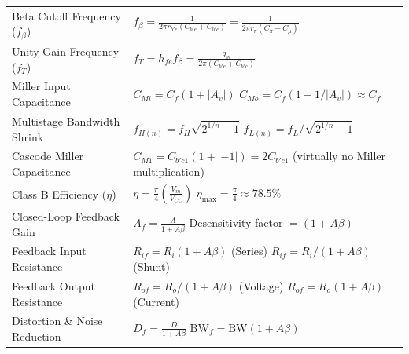 \documentclass[12pt,a4paper]{article}
\renewcommand{\arraystretch}{1.45}
\begin{document}
\begin{tcolorbox}[formulabox, title={Key Formulas at a Glance}]
\small
\renewcommand{\arraystretch}{1.35}
\setlength{\tabcolsep}{5pt}
\noindent\begin{tabularx}{\linewidth}{B{4.1cm}Y}
Beta Cutoff Frequency ($f_\beta$) & $f_\beta = \frac{1}{2\pi r_{b'e}(C_{b'e}+C_{b'c})} = \frac{1}{2\pi r_\pi (C_\pi + C_\mu)}$ \\[3pt]
Unity-Gain Frequency ($f_T$) & $f_T = h_{fe} f_\beta = \frac{g_m}{2\pi (C_{b'e}+C_{b'c})}$ \\[3pt]
Miller Input Capacitance & $C_{Mi} = C_f(1 + |A_v|)$ \newline $C_{Mo} = C_f(1 + 1/|A_v|) \approx C_f$ \\[3pt]
Multistage Bandwidth Shrink & $f_{H(n)} = f_H \sqrt{2^{1/n}-1}$ \newline $f_{L(n)} = f_L / \sqrt{2^{1/n}-1}$ \\[3pt]
Cascode Miller Capacitance & $C_{M1} = C_{b'c1}(1 + |-1|) = 2C_{b'c1}$ (virtually no Miller multiplication) \\[3pt]
Class B Efficiency ($\eta$) & $\eta = \frac{\pi}{4}\left(\frac{V_m}{V_{CC}}\right)$ \newline $\eta_{\max} = \frac{\pi}{4} \approx 78.5\%$ \\[3pt]
Closed-Loop Feedback Gain & $A_f = \frac{A}{1+A\beta}$ \newline Desensitivity factor $= (1+A\beta)$ \\[3pt]
Feedback Input Resistance & $R_{if} = R_i(1+A\beta)$ (Series) \newline $R_{if} = R_i/(1+A\beta)$ (Shunt) \\[3pt]
Feedback Output Resistance & $R_{of} = R_o/(1+A\beta)$ (Voltage) \newline $R_{of} = R_o(1+A\beta)$ (Current) \\[3pt]
Distortion \& Noise Reduction& $D_f = \frac{D}{1+A\beta}$ \newline $\mathrm{BW}_f = \mathrm{BW}(1+A\beta)$
\end{tabularx}\par
\end{tcolorbox}
\end{document}
